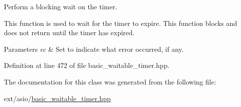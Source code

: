 Perform a blocking wait on the timer. 

This function is used to wait for the timer to expire. This function blocks and does not return until the timer has expired.


\begin{DoxyParams}{Parameters}
{\em ec} & Set to indicate what error occurred, if any. \\
\hline
\end{DoxyParams}


Definition at line 472 of file basic\+\_\+waitable\+\_\+timer.\+hpp.



The documentation for this class was generated from the following file\+:\begin{DoxyCompactItemize}
\item 
ext/asio/\hyperlink{basic__waitable__timer_8hpp}{basic\+\_\+waitable\+\_\+timer.\+hpp}\end{DoxyCompactItemize}
